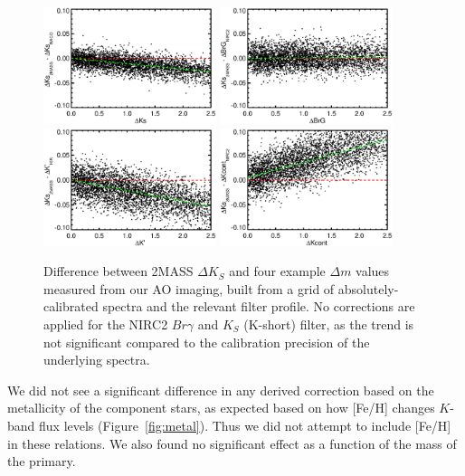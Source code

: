 \documentclass[twocolumn]{aastex62}
\begin{document}
\begin{figure}[htp]
\begin{center}
\includegraphics[width=0.45\textwidth]{NACO_Ks.eps}
\includegraphics[width=0.45\textwidth]{NIRC2_BrG.eps}
\includegraphics[width=0.45\textwidth]{KIR_Kp.eps}
\includegraphics[width=0.45\textwidth]{NIRC2_Kcont.eps}
\caption{Difference between 2MASS $\Delta K_S$ and four example $\Delta m$ values measured from our AO imaging, built from a grid of absolutely-calibrated spectra and the relevant filter profile. No corrections are applied for the NIRC2 $Br\gamma$ and $K_S$ (K-short) filter, as the trend is not significant compared to the calibration precision of the underlying spectra. }
\label{fig:mags}
\end{center}
\end{figure}

We did not see a significant difference in any derived correction based on the metallicity of the component stars, as expected based on how [Fe/H] changes $K$-band flux levels (Figure~\ref{fig:metal}). Thus we did not attempt to include [Fe/H] in these relations. We also found no significant effect as a function of the mass of the primary. 
\end{document}
